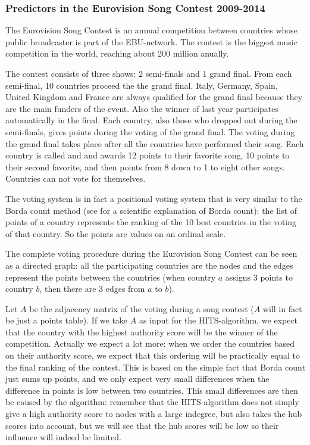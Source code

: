 \documentclass[a4paper,11pt]{report}
\begin{document}
 \subsubsection{Predictors in the Eurovision Song Contest 2009-2014}
 The Eurovision Song Contest is an annual competition between countries whose 
 public broadcaster is part of the EBU-network. The contest is the biggest music 
 competition in the world, reaching about 200 million anually.
  
 The contest consists of three shows: 2 semi-finals and 1 grand final. From each 
 semi-final, 10 countries proceed the the grand final. Italy, Germany, Spain, United Kingdom and France are 
 always qualified for the grand final because they are the main funders of the event. 
 Also the winner of last year participates automatically in the final. Each country, also those 
 who dropped out during the semi-finals, gives points during the voting of the grand final. 
The voting during the grand final takes place after all the countries have performed their song. 
Each country is called and and awards 12 points to their 
favorite song, 10 points to their second favorite, and then points from 8 down 
to 1 to eight other songs. Countries can not vote for themselves. 

The voting 
system is in fact a positional voting system that is very similar to the Borda count 
method (see \cite{saari} for a scientific explanation of Borda count): the list 
of points of a country represents the ranking of the 10 best countries in the voting of that country. 
So the points are values on an ordinal scale.

The complete voting procedure during the Eurovision Song Contest can be seen as 
a directed graph: all the participating countries are the nodes and the edges 
represent the points between the countries (when country $a$ assigns 3 points to country $b$, then there are 3 edges from $a$ to 
$b$).

Let $A$ be the adjacency matrix of the voting during a song contest ($A$ will in fact be just a points table). If we 
take $A$ as input for the HITS-algorithm, we expect that the country with the 
highest authority score will be the winner of the competition. Actually we 
expect a lot more: when we order the countries based on their authority score, 
we expect that this ordering will be practically equal to the final ranking of the contest. 
This is based on the simple fact that Borda count just sums up points, and we 
only expect very small differences when the difference in points is low between 
two countries. This small differences are then be caused by the algorithm: remember 
that the HITS-algorithm does not simply give a high authority score to nodes 
with a large indegree, but also takes the hub scores into account, but we will 
see that the hub scores will be low so their influence will indeed be limited.
\end{document}
